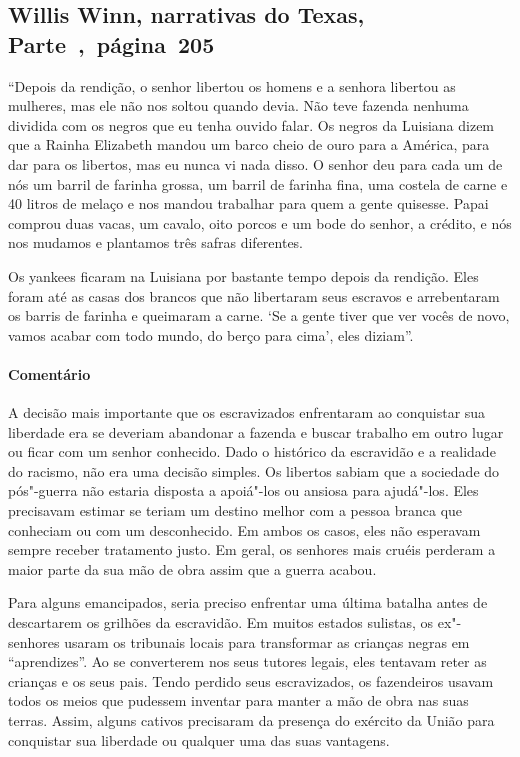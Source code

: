 \subsection{Willis Winn, narrativas do Texas, Parte~,~página~205}
\label{ref305}

``Depois da rendição, o senhor libertou os homens e a senhora libertou
as mulheres, mas ele não nos soltou quando devia. Não teve fazenda
nenhuma dividida com os negros que eu tenha ouvido falar. Os negros da
Luisiana dizem que a Rainha Elizabeth mandou um barco cheio de ouro para
a América, para dar para os libertos, mas eu nunca vi nada disso. O
senhor deu para cada um de nós um barril de farinha grossa, um barril de
farinha fina, uma costela de carne e 40 litros de melaço e nos mandou
trabalhar para quem a gente quisesse. Papai comprou duas vacas, um
cavalo, oito porcos e um bode do senhor, a crédito, e nós nos mudamos e
plantamos três safras diferentes.

Os yankees ficaram na Luisiana por bastante tempo depois da rendição.
Eles foram até as casas dos brancos que não libertaram seus escravos e
arrebentaram os barris de farinha e queimaram a carne. `Se a gente tiver
que ver vocês de novo, vamos acabar com todo mundo, do berço para cima',
eles diziam''.

\paragraph{Comentário}\quad
{\small
A decisão mais importante que os escravizados enfrentaram ao
conquistar sua liberdade era se deveriam abandonar a fazenda e buscar
trabalho em outro lugar ou ficar com um senhor conhecido. Dado o
histórico da escravidão e a realidade do racismo, não era uma decisão
simples. Os libertos sabiam que a sociedade do pós"-guerra não
estaria disposta a apoiá"-los ou ansiosa para ajudá"-los. Eles precisavam
estimar se teriam um destino melhor com a pessoa branca que conheciam ou
com um desconhecido. Em ambos os casos, eles não esperavam sempre
receber tratamento justo. Em geral, os senhores mais cruéis perderam a
maior parte da sua mão de obra assim que a guerra acabou.

Para alguns emancipados, seria preciso enfrentar uma última
batalha antes de descartarem os grilhões da escravidão. Em muitos
estados sulistas, os ex"-senhores usaram os tribunais locais para
transformar as crianças negras em ``aprendizes''. Ao se converterem nos
seus tutores legais, eles tentavam reter as crianças e os seus pais.
Tendo perdido seus escravizados, os fazendeiros usavam todos os meios que
pudessem inventar para manter a mão de obra nas suas terras. Assim,
alguns cativos precisaram da presença do exército da União
para conquistar sua liberdade ou qualquer uma das suas vantagens.
}


